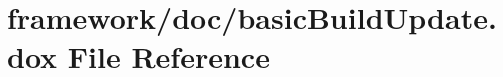 \hypertarget{basic_build_update_8dox}{}\section{framework/doc/basic\+Build\+Update.dox File Reference}
\label{basic_build_update_8dox}
